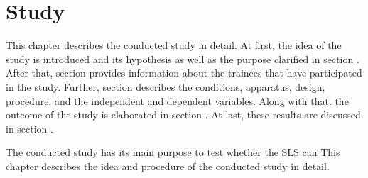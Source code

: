 \chapter{Study}\label{6_study}
This chapter describes the conducted study in detail. 
At first, the idea of the study is introduced and its hypothesis as well as the purpose clarified in section \textit{}.
After that, section \textit{} provides information about the trainees that have participated in the study.
Further, section \textit{} describes the conditions, apparatus, design, procedure, and the independent and dependent variables.
Along with that, the outcome of the study is elaborated  in section \textit{}.
At last, these results are discussed in section \textit{}.
\begin{comment}
This chapter describes the idea and procedure of the conducted study in detail.
At first, the introduction and goals are clarified.
After that, information about the participants is given.
In the following, the structure of the study is described, which includes the different conditions, apparatus, design, procedure, and the independent and dependent variables.
Along with that, the results are analysed and their outcome discussed.
\end{comment}
The conducted study has its main purpose to test whether the SLS can 
This chapter describes the idea and procedure of the conducted study in detail.






